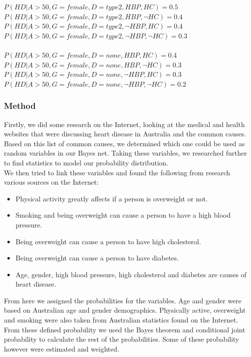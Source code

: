 \documentclass{article}
\begin{document}
$P(HD | A > 50, G = female, D = type2, HBP, HC) = 0.5 $\\
$P(HD | A > 50, G = female, D = type2, HBP, \neg HC) = 0.4$\\
$P(HD | A > 50, G = female, D = type2, \neg HBP, HC) = 0.4$\\
$P(HD | A > 50, G = female, D = type2, \neg HBP, \neg HC) = 0.3$\\
\\
$P(HD | A > 50, G = female, D = none, HBP, HC) = 0.4$\\
$P(HD | A > 50, G = female, D = none, HBP, \neg HC) = 0.3$\\
$P(HD | A > 50, G = female, D = none, \neg HBP, HC) = 0.3$\\
$P(HD | A > 50, G = female, D = none, \neg HBP, \neg HC) = 0.2$

\subsubsection{Method}
Firstly, we did some research on the Internet, looking at the medical and health websites that were discussing heart disease in Australia and the common causes. Based on this list of common causes, we determined which one could be used as random variables in our Bayes net. Taking these variables, we researched further to find statistics to model our probability distribution.\\

We then tried to link these variables and found the following from research various sources on the Internet:
\begin{itemize}
\item Physical activity greatly affects if a person is overweight or not.
\item Smoking and being overweight can cause a person to have a high blood pressure.
\item Being overweight can cause a person to have high cholesterol.
\item Being overweight can cause a person to have diabetes.
\item Age, gender, high blood pressure, high cholesterol and diabetes are causes of heart disease.
\end{itemize} 

From here we assigned the probabilities for the variables. Age and gender were based on Australian age and gender demographics. Physically active, overweight and smoking were also taken from Australian statistics found on the Internet. From these defined probability we used the Bayes theorem and conditional joint probability to calculate the rest of the probabilities. Some of these probability however were estimated and weighted. \\
\end{document}
